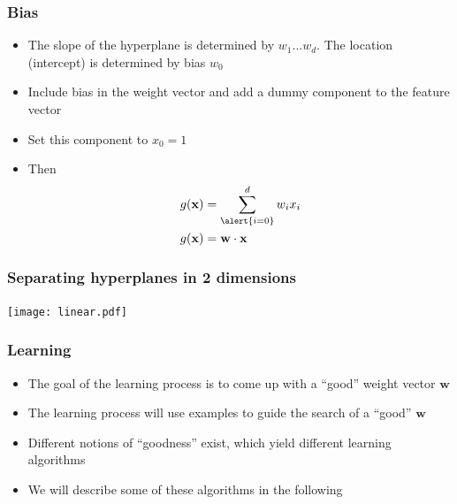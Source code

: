\documentclass[14pt,mathserif,dvipsnames,usenames]{beamer}
\newcommand{\x}{\mathbf{x}}
\newcommand{\w}{\mathbf{w}}
\begin{document}
\begin{frame}
 \frametitle{Bias}
\begin{itemize}
\item The slope of the hyperplane is determined by
  $w_1...w_d$. The location (intercept) is determined by  bias $w_0$
\item Include bias in the
  weight vector and add a dummy component to the feature vector
\item Set this component to $x_0 = 1$
\item Then 
 \begin{align*}
 g(\x) & = \sum_{\alert{i=0}}^d w_i x_i\\
 g(\x) & = \w \cdot \x
\end{align*}
\end{itemize}
\end{frame}

\begin{frame}
\label{hyperplanes}
\frametitle{Separating hyperplanes in 2 dimensions}
\begin{center}
\vskip -0.5cm 
\texttt{[image: linear.pdf]}
\end{center}
\end{frame}

\begin{frame}
 \frametitle{Learning}
\begin{itemize}
\item The goal of the learning process is to come up with a ``good''
  weight vector $\w$
\item The learning process will use examples to guide the search of a
  ``good'' $\w$
\item Different notions of ``goodness'' exist, which yield different
  learning algorithms
\item We will describe some of these algorithms in the following
\end{itemize}
\end{frame}
\end{document}
